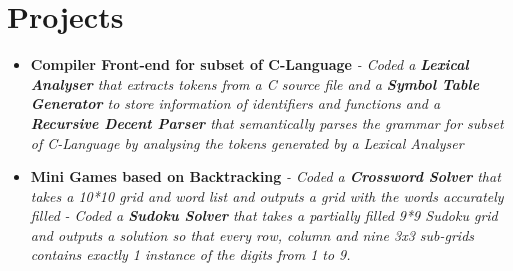 \documentclass{article}
\begin{document}
\section*{Projects}
\begin{itemize}
    \item{\textbf{\large{Compiler Front-end for subset of C-Language}}}
          \newline
          \textit{- Coded a \textbf{Lexical Analyser} that extracts tokens from a C source file and a \textbf{Symbol Table Generator} to store information of identifiers and functions and a \textbf{Recursive Decent Parser} that semantically parses the grammar for subset of C-Language by analysing the tokens generated by a Lexical Analyser}
    \item{\textbf{\large{Mini Games based on Backtracking}}}
          \newline
          \textit{- Coded a \textbf{Crossword Solver} that takes a 10*10 grid and word list and outputs a grid with the words accurately filled}
          \newline
          \textit{- Coded a \textbf{Sudoku Solver} that takes a partially filled 9*9 Sudoku grid and outputs a solution so that every row, column and nine 3x3 sub-grids contains exactly 1 instance of the digits from 1 to 9.}


\end{itemize}
\end{document}
